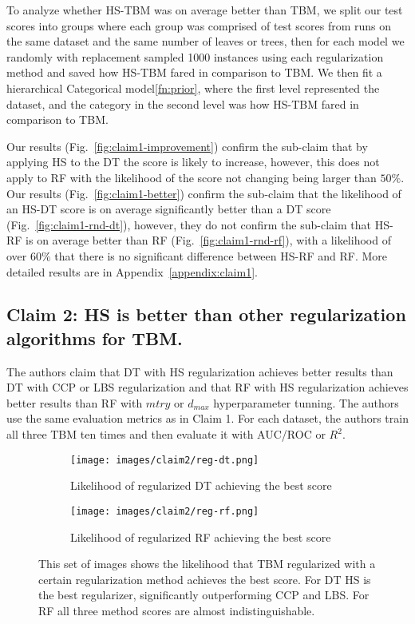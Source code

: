 To analyze whether HS-TBM was on average better than TBM, we split our test scores into groups where each group was comprised of test scores from runs on the same dataset and the same number of leaves or trees, then for each model we randomly with replacement sampled 1000 instances using each regularization method and saved how HS-TBM fared in comparison to TBM. We then fit a hierarchical Categorical model\ref{fn:prior}, where the first level represented the dataset, and the category in the second level was how HS-TBM fared in comparison to TBM.

Our results (Fig.~\ref{fig:claim1-improvement}) confirm the sub-claim that by applying HS to the DT the score is likely to increase, however, this does not apply to RF with the likelihood of the score not changing being larger than $50\%$. 
Our results (Fig.~\ref{fig:claim1-better}) confirm the sub-claim that the likelihood of an HS-DT score is on average significantly better than a DT score (Fig.~\ref{fig:claim1-rnd-dt}), however, they do not confirm the sub-claim that HS-RF is on average better than RF (Fig.~\ref{fig:claim1-rnd-rf}), with a likelihood of over $60\%$ that there is no significant difference between HS-RF and RF. More detailed results are in Appendix~\ref{appendix:claim1}.

\subsection{Claim 2: HS is better than other regularization algorithms for TBM.}

The authors claim that DT with HS regularization achieves better results than DT with CCP or LBS regularization and that RF with HS regularization achieves better results than RF with $mtry$ or $d_{max}$ hyperparameter tunning. The authors use the same evaluation metrics as in Claim 1. For each dataset, the authors train all three TBM ten times and then evaluate it with AUC/ROC or $R^2$.

\begin{figure}[hbt]
     \centering
     \begin{subfigure}[b]{0.43\textwidth}
         \centering
         \texttt{[image: images/claim2/reg-dt.png]}
         \caption{Likelihood of regularized DT achieving the best score}
         \label{fig:claim2-reg-dt}
     \end{subfigure}
     \hfill
     \begin{subfigure}[b]{0.43\textwidth}
         \centering
         \texttt{[image: images/claim2/reg-rf.png]}
         \caption{Likelihood of regularized RF achieving the best score}
         \label{fig:claim2-reg-rf}
     \end{subfigure}
        \caption{This set of images shows the likelihood that TBM regularized with a certain regularization method achieves the best score. 
        For DT HS is the best regularizer, significantly outperforming CCP and LBS.
        For RF all three method scores are almost indistinguishable.}
        \label{fig:claim2}
\end{figure}

